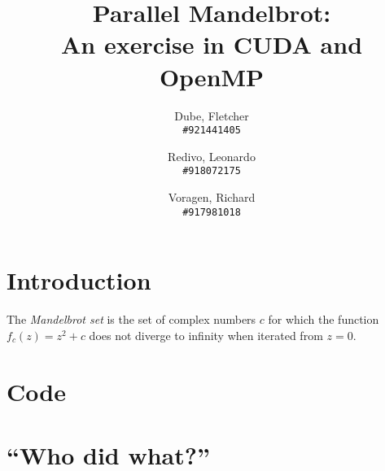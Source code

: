 \documentclass{article}
\author{
	Dube, Fletcher\\
	\texttt{\#921441405}
	\and
	Redivo, Leonardo\\
	\texttt{\#918072175}
	\and
	Voragen, Richard\\
	\texttt{\#917981018}
}
\title{Parallel Mandelbrot: \\An exercise in CUDA and OpenMP}
\begin{document}
\maketitle

\section{Introduction}
The \emph{Mandelbrot set} is the set of complex numbers $c$ for which the function $f_c(z) = z^2 + c$ does not diverge to infinity when iterated from $z = 0$. \cite{mandel_wiki}

\appendix
\section{Code}
\lstset{language=C,stringstyle=\ttfamily, showstringspaces=false, numbers=left, frame=single, framexrightmargin=0pt, columns=fullflexible, breaklines=true, breakatwhitespace=true}


\section{``Who did what?''}

\printbibliography
\end{document}
